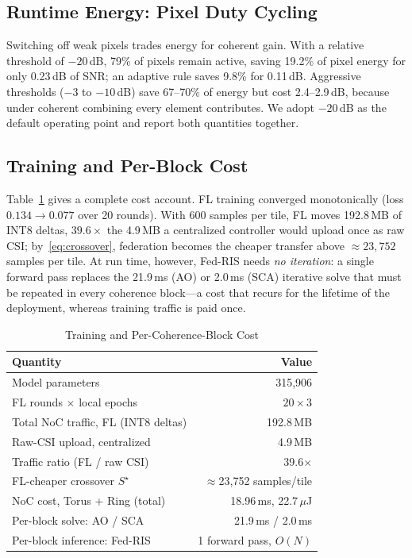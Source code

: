 \documentclass[conference]{IEEEtran}
\newcommand{\fedris}{Fed-RIS}
\newcommand{\dB}{\,dB\xspace}
\begin{document}
\subsection{Runtime Energy: Pixel Duty Cycling}

Switching off weak pixels trades energy for coherent gain. With a relative threshold of $-20$\dB, 79\% of pixels remain active, saving 19.2\% of pixel energy for only 0.23\dB of SNR; an adaptive rule saves 9.8\% for 0.11\dB. Aggressive thresholds ($-3$ to $-10$\dB) save 67--70\% of energy but cost 2.4--2.9\dB, because under coherent combining every element contributes. We adopt $-20$\dB as the default operating point and report both quantities together.

\subsection{Training and Per-Block Cost}

Table~\ref{tab:cost} gives a complete cost account. FL training converged monotonically (loss $0.134\rightarrow0.077$ over 20 rounds). With 600 samples per tile, FL moves 192.8\,MB of INT8 deltas, $39.6\times$ the 4.9\,MB a centralized controller would upload once as raw CSI; by~\eqref{eq:crossover}, federation becomes the cheaper transfer above ${\approx}23{,}752$ samples per tile. At run time, however, \fedris{} needs \emph{no iteration}: a single forward pass replaces the 21.9\,ms (AO) or 2.0\,ms (SCA) iterative solve that must be repeated in every coherence block---a cost that recurs for the lifetime of the deployment, whereas training traffic is paid once.

\begin{table}[t]
\centering
\caption{Training and Per-Coherence-Block Cost}
\label{tab:cost}
\renewcommand{\arraystretch}{1.1}
\footnotesize
\begin{tabular}{@{}lr@{}}
\toprule
\textbf{Quantity} & \textbf{Value} \\
\midrule
Model parameters & 315,906 \\
FL rounds $\times$ local epochs & $20 \times 3$ \\
Total NoC traffic, FL (INT8 deltas) & 192.8\,MB \\
Raw-CSI upload, centralized & 4.9\,MB \\
Traffic ratio (FL / raw CSI) & 39.6$\times$ \\
FL-cheaper crossover $S^\star$ & ${\approx}$23,752 samples/tile \\
NoC cost, Torus + Ring (total) & 18.96\,ms, 22.7\,$\mu$J \\
Per-block solve: AO / SCA & 21.9\,ms / 2.0\,ms \\
Per-block inference: \fedris{} & 1 forward pass, $O(N)$ \\
\bottomrule
\end{tabular}
\end{table}
\end{document}
